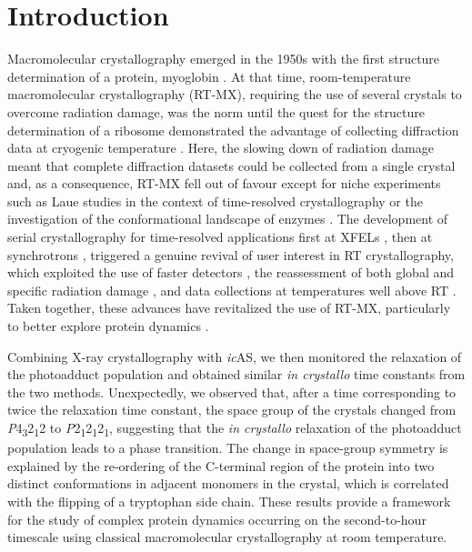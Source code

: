 \section{Introduction}
Macromolecular crystallography emerged in the 1950s with the first structure determination of a protein, myoglobin \parencite{kendrewThreeDimensionalModelMyoglobin1958}. At that time, room-temperature macromolecular crystallography (RT-MX), requiring the use of several crystals to overcome radiation damage, was the norm until the quest for the structure determination of a ribosome demonstrated the advantage of collecting diffraction data at cryogenic temperature \parencite{hopeCryocrystallographyRibosomalParticles1989}. Here, the slowing down of radiation damage meant that complete diffraction datasets could be collected from a single crystal and, as a consequence, RT-MX fell out of favour except for niche experiments such as Laue studies in the context of time-resolved crystallography \parencite{moffatLaueDiffractionTimeresolved2019} or the investigation of the conformational landscape of enzymes \parencite{fraserHiddenAlternateStructures2009}. The development of serial crystallography for time-resolved applications first at XFELs \parencite{schlichtingSerialFemtosecondCrystallography2015}, then at synchrotrons \parencite{pearsonSerialSynchrotronCrystallography2020}, triggered a genuine revival of user interest in RT crystallography, which exploited the use of faster detectors \parencite{owenExploitingFastDetectors2014}, the reassessment of both global \parencite{lealSurveyGlobalRadiation2013} and specific radiation damage \parencite{gotthardSpecificRadiationDamage2019}, and data collections at temperatures well above RT \parencite{doukovInstrumentationExperimentalProcedures2020}. Taken together, these advances have revitalized the use of RT-MX, particularly to better explore protein dynamics \parencite{fraserAccessingProteinConformational2011, woldeyesPluribusUnumNo2014, bhabhaKeepMovingDiscovering2015, russiConformationalVariationProteins2017}. 


Combining X-ray crystallography with \textit{ic}AS, we then monitored the relaxation of the photoadduct population and obtained similar \textit{in crystallo} time constants from the two methods. Unexpectedly, we observed that, after a time corresponding to twice the relaxation time constant, the space group of the crystals changed from \textit{P}4\textsubscript{3}2\textsubscript{1}2 to \textit{P}2\textsubscript{1}2\textsubscript{1}2\textsubscript{1}, suggesting that the \textit{in crystallo} relaxation of the photoadduct population leads to a phase transition. The change in space-group symmetry is explained by the re-ordering of the C-terminal region of the protein into two distinct conformations in adjacent monomers in the crystal, which is correlated with the flipping of a tryptophan side chain. These results provide a framework for the study of complex protein dynamics occurring on the second-to-hour timescale using classical macromolecular crystallography at room temperature.
